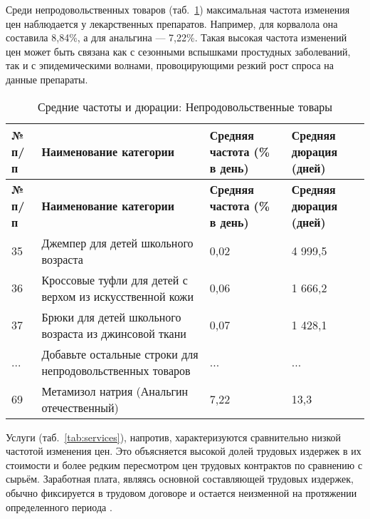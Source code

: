 Среди непродовольственных товаров (таб.~\ref{tab:non_food_products}) максимальная частота изменения цен наблюдается у лекарственных препаратов. Например, для корвалола она составила 8,84\%, а для анальгина — 7,22\%. Такая высокая частота изменений цен может быть связана как с сезонными вспышками простудных заболеваний, так и с эпидемическими волнами, провоцирующими резкий рост спроса на данные препараты.

\begin{longtable}{|p{1cm}|p{8.5cm}|p{3.5cm}|p{3cm}|} %
	\caption{Средние частоты и дюрации: Непродовольственные товары}
	\label{tab:non_food_products} \\
	\hline
	\textbf{№ п/п} & \textbf{Наименование категории} & \textbf{Средняя частота (\% в день)} & \textbf{Средняя дюрация (дней)} \\
	\hline
	\hline
	\endfirsthead
	
	\hline
	\textbf{№ п/п} & \textbf{Наименование категории} & \textbf{Средняя частота (\% в день)} & \textbf{Средняя дюрация (дней)} \\
	\hline
	\hline
	\endhead
	
	\hline
	\endfoot
	
	\hline
	\endlastfoot
	
	35 & Джемпер для детей школьного возраста & 0,02 & 4 999,5 \\ \hline
	36 & Кроссовые туфли для детей с верхом из искусственной кожи & 0,06 & 1 666,2 \\ \hline
	37 & Брюки для детей школьного возраста из джинсовой ткани & 0,07 & 1 428,1 \\ \hline
	... & Добавьте остальные строки для непродовольственных товаров & ... & ... \\ \hline
	69 & Метамизол натрия (Анальгин отечественный) & 7,22 & 13,3 \\ \hline
	
\end{longtable}

Услуги (таб.~\ref{tab:services}), напротив, характеризуются сравнительно низкой частотой изменения цен. Это объясняется высокой долей трудовых издержек в их стоимости и более редким пересмотром цен трудовых контрактов по сравнению с сырьём. Заработная плата, являясь основной составляющей трудовых издержек, обычно фиксируется в трудовом договоре и остается неизменной на протяжении определенного периода \cite{Vermeulen2012}.

